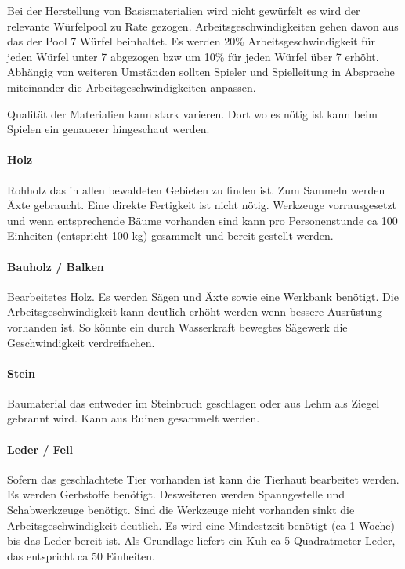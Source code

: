 \documentclass{article}
\begin{document}
Bei der Herstellung von Basismaterialien wird nicht gewürfelt es wird der relevante Würfelpool zu Rate gezogen.
Arbeitsgeschwindigkeiten gehen davon aus das der Pool 7 Würfel beinhaltet. Es werden 20\% Arbeitsgeschwindigkeit für
jeden Würfel unter 7 abgezogen bzw um 10\% für jeden Würfel über 7 erhöht. Abhängig von weiteren Umständen sollten
Spieler und Spielleitung in Absprache miteinander die Arbeitsgeschwindigkeiten anpassen.

Qualität der Materialien kann stark varieren. Dort wo es nötig ist kann beim Spielen ein genauerer hingeschaut
werden.

\paragraph{Holz}

Rohholz das in allen bewaldeten Gebieten zu finden ist. Zum Sammeln werden Äxte gebraucht. Eine direkte Fertigkeit
ist nicht nötig. Werkzeuge vorrausgesetzt und wenn entsprechende Bäume vorhanden sind kann pro Personenstunde ca
100 Einheiten (entspricht 100 kg) gesammelt und bereit gestellt werden.

\paragraph{Bauholz / Balken}

Bearbeitetes Holz. Es werden Sägen und Äxte sowie eine Werkbank benötigt. Die Arbeitsgeschwindigkeit kann deutlich
erhöht werden wenn bessere Ausrüstung vorhanden ist. So könnte ein durch Wasserkraft bewegtes Sägewerk die
Geschwindigkeit verdreifachen.

\paragraph{Stein}

Baumaterial das entweder im Steinbruch geschlagen oder aus Lehm als Ziegel gebrannt wird. Kann aus Ruinen gesammelt
werden.

\paragraph{Leder / Fell}

Sofern das geschlachtete Tier vorhanden ist kann die Tierhaut bearbeitet werden. Es werden Gerbstoffe benötigt.
Desweiteren werden Spanngestelle und Schabwerkzeuge benötigt. Sind die Werkzeuge nicht vorhanden sinkt die
Arbeitsgeschwindigkeit deutlich. Es wird eine Mindestzeit benötigt (ca 1 Woche) bis das Leder bereit ist. Als
Grundlage liefert ein Kuh ca 5 Quadratmeter Leder, das entspricht ca 50 Einheiten.
\end{document}
